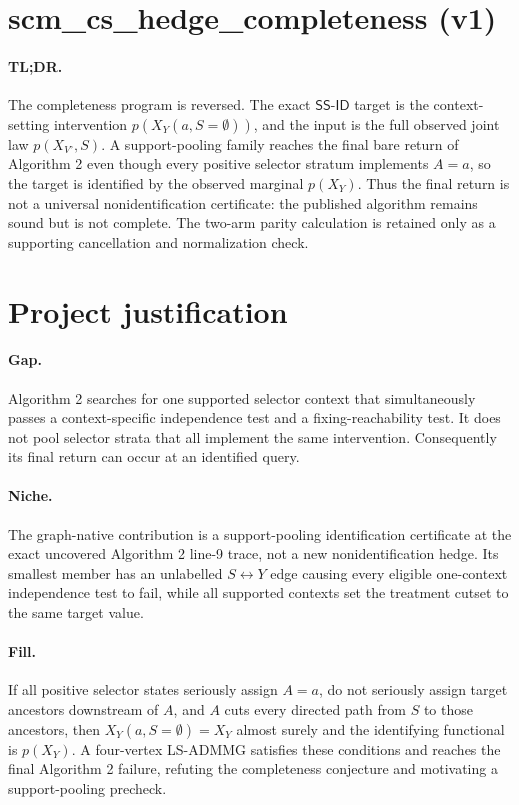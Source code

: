 \documentclass{article}
\begin{document}
\section*{scm\_cs\_hedge\_completeness (v1)}

\paragraph{TL;DR.} The completeness program is reversed. The exact \(\mathsf{SS\text{-}ID}\) target is the context-setting intervention \(p(X_Y(a,S=\emptyset))\), and the input is the full observed joint law \(p(X_{V^\circ},S)\). A support-pooling family reaches the final bare return of Algorithm 2 even though every positive selector stratum implements \(A=a\), so the target is identified by the observed marginal \(p(X_Y)\). Thus the final return is not a universal nonidentification certificate: the published algorithm remains sound but is not complete. The two-arm parity calculation is retained only as a supporting cancellation and normalization check.

\section{Project justification}

\paragraph{Gap.} Algorithm 2 searches for one supported selector context that simultaneously passes a context-specific independence test and a fixing-reachability test. It does not pool selector strata that all implement the same intervention. Consequently its final return can occur at an identified query.

\paragraph{Niche.} The graph-native contribution is a support-pooling identification certificate at the exact uncovered Algorithm 2 line-9 trace, not a new nonidentification hedge. Its smallest member has an unlabelled \(S\leftrightarrow Y\) edge causing every eligible one-context independence test to fail, while all supported contexts set the treatment cutset to the same target value.

\paragraph{Fill.} If all positive selector states seriously assign \(A=a\), do not seriously assign target ancestors downstream of \(A\), and \(A\) cuts every directed path from \(S\) to those ancestors, then \(X_Y(a,S=\emptyset)=X_Y\) almost surely and the identifying functional is \(p(X_Y)\). A four-vertex LS-ADMMG satisfies these conditions and reaches the final Algorithm 2 failure, refuting the completeness conjecture and motivating a support-pooling precheck.
\end{document}
